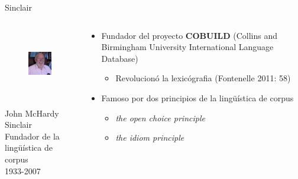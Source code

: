 \documentclass{beamer}
\begin{document}
\begin{frame}{Sinclair}
	\begin{columns}
    	\begin{column}{6cm}
        	\begin{figure}
    		\includegraphics[height=3cm]{sinclair.jpg}
       		\end{figure}
            \begin{center}
			\begin{tiny}
            John McHardy Sinclair \\
			Fundador de la lingüística de corpus \\
			1933-2007\\
            \end{tiny}
			\end{center}
        \end{column}
        \begin{column}{6cm}
        	\begin{itemize}
            	\pause
                \item Fundador del proyecto \textbf{COBUILD} (Collins and Birmingham University International Language Database)
                \begin{itemize}
                	\pause
                    \item Revolucionó la lexicógrafia (Fontenelle 2011: 58)
                \end{itemize}
                \pause
                \item Famoso por dos principios de la lingüística de corpus
                \begin{itemize}
                	\pause
                    \item \textit{the open choice principle}
                    \pause
                    \item \textit{the idiom principle}
                \end{itemize}
            \end{itemize}
        \end{column}
    \end{columns}
\end{frame}
\end{document}
